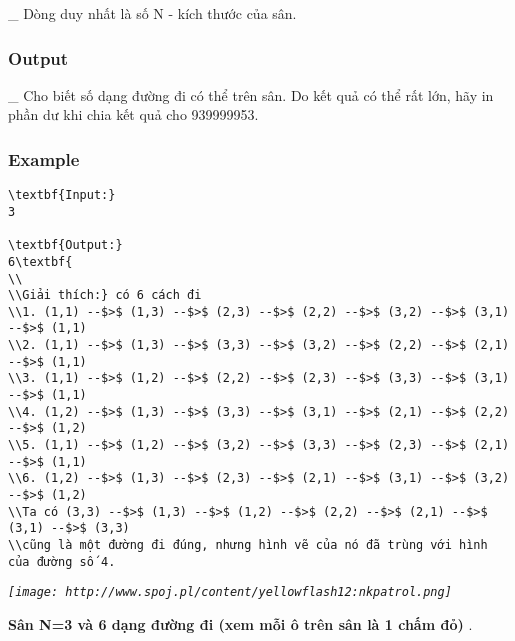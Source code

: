    \_ Dòng duy nhất là số N - kích thước của sân.  

\subsubsection{   Output  }

   \_ Cho biết số dạng đường đi có thể trên sân. Do kết quả có thể rất lớn, hãy in phần dư khi chia kết quả cho 939999953.  

\subsubsection{   Example  }
\begin{verbatim}
\textbf{Input:}
3

\textbf{Output:}
6\textbf{
\\
\\Giải thích:} có 6 cách đi
\\1. (1,1) --$>$ (1,3) --$>$ (2,3) --$>$ (2,2) --$>$ (3,2) --$>$ (3,1) --$>$ (1,1)
\\2. (1,1) --$>$ (1,3) --$>$ (3,3) --$>$ (3,2) --$>$ (2,2) --$>$ (2,1) --$>$ (1,1)
\\3. (1,1) --$>$ (1,2) --$>$ (2,2) --$>$ (2,3) --$>$ (3,3) --$>$ (3,1) --$>$ (1,1)
\\4. (1,2) --$>$ (1,3) --$>$ (3,3) --$>$ (3,1) --$>$ (2,1) --$>$ (2,2) --$>$ (1,2)
\\5. (1,1) --$>$ (1,2) --$>$ (3,2) --$>$ (3,3) --$>$ (2,3) --$>$ (2,1) --$>$ (1,1)
\\6. (1,2) --$>$ (1,3) --$>$ (2,3) --$>$ (2,1) --$>$ (3,1) --$>$ (3,2) --$>$ (1,2)
\\Ta có (3,3) --$>$ (1,3) --$>$ (1,2) --$>$ (2,2) --$>$ (2,1) --$>$ (3,1) --$>$ (3,3) 
\\cũng là một đường đi đúng, nhưng hình vẽ của nó đã trùng với hình của đường số 4.\end{verbatim}

\emph{
\texttt{[image: http://www.spoj.pl/content/yellowflash12:nkpatrol.png]}}

\textbf{    Sân N=3 và 6 dạng đường đi (xem mỗi ô trên sân là 1 chấm đỏ)   }   .  

